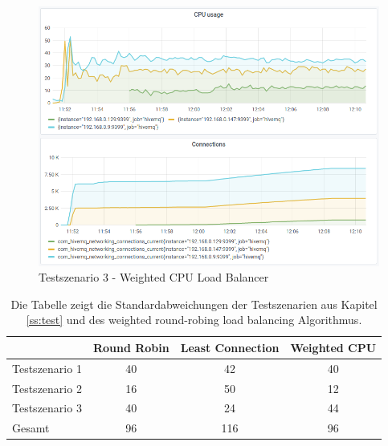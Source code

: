 \begin{figure}
    \centering
    \includegraphics[scale=0.8]{images/s3_cpu.png}
    \caption{Testszenario 3 - Weighted CPU Load Balancer}
    \label{fig:s3-cpu}
\end{figure}

\begin{table}[h!]
\centering
\renewcommand{\arraystretch}{1.5}
\begin{tabular}{|l|c|c|c|}
    \hline
    & Round Robin & Least Connection & Weighted CPU \\
    \hline
    Testszenario 1 & 40 & 42 & 40 \\
    \hline
    Testszenario 2 & 16 & 50 & 12 \\
    \hline
    Testszenario 3 & 40 & 24 & 44 \\
    \hline
    \hline
    Gesamt & 96 & 116 & 96 \\
    \hline
\end{tabular}
\caption{Die Tabelle zeigt die Standardabweichungen der Testszenarien aus Kapitel \ref{ss:test} und des weighted round-robing load balancing Algorithmus.}
\label{table:test-output}
\end{table}

